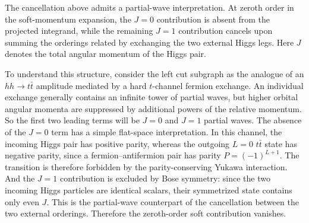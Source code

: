 \documentclass[a4paper,12pt]{article}
\def\to{\rightarrow}
\begin{document}
The cancellation above admits a partial-wave interpretation.
At zeroth order in the soft-momentum expansion, the $J=0$ contribution is absent from the projected integrand, while the remaining $J=1$ contribution cancels upon summing the orderings related by exchanging the two external Higgs legs.
Here $J$ denotes the total angular momentum of the Higgs pair.

To understand this structure, consider the left cut subgraph as the analogue of an $hh\to t\bar t$ amplitude mediated by a hard $t$-channel fermion exchange.
An individual exchange generally contains an infinite tower of partial waves, but higher orbital angular momenta are suppressed by additional powers of the relative momentum.
So the first two leading terms will be $J=0$ and $J=1$ partial waves.
The absence of the $J=0$ term has a simple flat-space interpretation.
In this channel, the incoming Higgs pair has positive parity, whereas the outgoing $L=0$ $t\bar t$ state has negative parity, since a fermion--antifermion pair has parity $P=(-1)^{L+1}$.
The transition is therefore forbidden by the parity-conserving Yukawa interaction.
And the $J=1$ contribution is excluded by Bose symmetry: since the two incoming Higgs particles are identical scalars, their symmetrized state contains only even $J$.
This is the partial-wave counterpart of the cancellation between the two external orderings.
Therefore the zeroth-order soft contribution vanishes.
\end{document}
